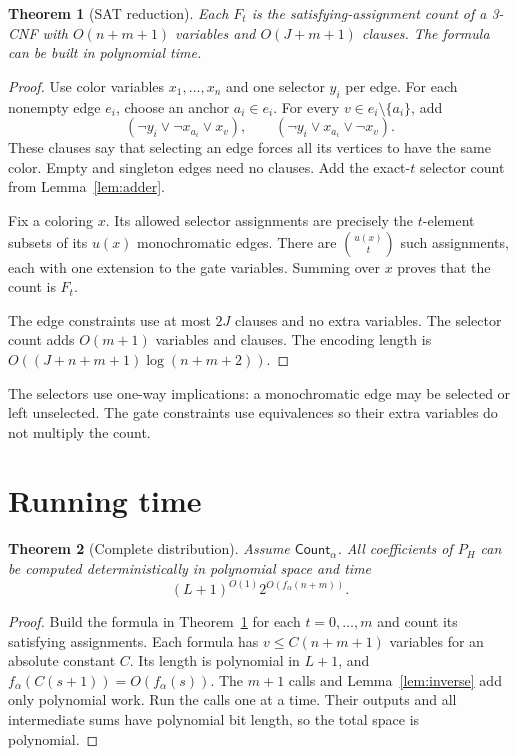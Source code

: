 \documentclass[11pt]{article}
\newtheorem{theorem}{Theorem}[section]
\theoremstyle{definition}
\newcommand{\Count}{\mathsf{Count}}
\begin{document}
\begin{theorem}[SAT reduction]\label{thm:encoding}
Each $F_t$ is the satisfying-assignment count of a 3-CNF with
$O(n+m+1)$ variables and $O(J+m+1)$ clauses.
The formula can be built in polynomial time.
\end{theorem}
\begin{proof}
Use color variables $x_1,\ldots,x_n$ and one selector $y_i$ per edge.
For each nonempty edge $e_i$, choose an anchor $a_i\in e_i$.
For every $v\in e_i\setminus\{a_i\}$, add
\begin{equation}\label{eq:guards}
 (\neg y_i\vee\neg x_{a_i}\vee x_v),\qquad
 (\neg y_i\vee x_{a_i}\vee\neg x_v).
\end{equation}
These clauses say that selecting an edge forces all its vertices to have
the same color.
Empty and singleton edges need no clauses.
Add the exact-$t$ selector count from Lemma~\ref{lem:adder}.

Fix a coloring $x$.
Its allowed selector assignments are precisely the $t$-element subsets of
its $u(x)$ monochromatic edges.
There are $\binom{u(x)}t$ such assignments, each with one extension to
the gate variables.
Summing over $x$ proves that the count is $F_t$.

The edge constraints use at most $2J$ clauses and no extra variables.
The selector count adds $O(m+1)$ variables and clauses.
The encoding length is
$O((J+n+m+1)\log(n+m+2))$.
\end{proof}

The selectors use one-way implications: a monochromatic edge may be
selected or left unselected.
The gate constraints use equivalences so their extra variables do not
multiply the count.

\section{Running time}

\begin{theorem}[Complete distribution]\label{thm:profile}
Assume $\Count_\alpha$.
All coefficients of $P_H$ can be computed deterministically in polynomial
space and time
\begin{equation}\label{eq:profile}
 (L+1)^{O(1)}2^{O(f_\alpha(n+m))}.
\end{equation}
\end{theorem}
\begin{proof}
Build the formula in Theorem~\ref{thm:encoding} for each $t=0,\ldots,m$
and count its satisfying assignments.
Each formula has $v\le C(n+m+1)$ variables for an absolute constant $C$.
Its length is polynomial in $L+1$, and
$f_\alpha(C(s+1))=O(f_\alpha(s))$.
The $m+1$ calls and Lemma~\ref{lem:inverse} add only polynomial work.
Run the calls one at a time.
Their outputs and all intermediate sums have polynomial bit length,
so the total space is polynomial.
\end{proof}
\end{document}
